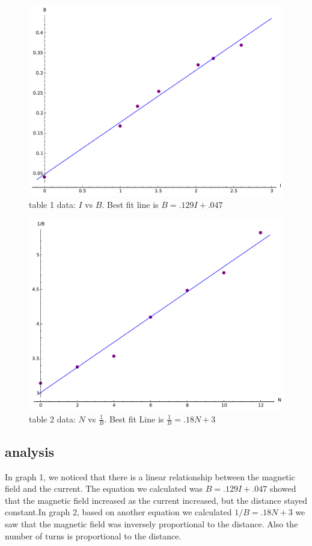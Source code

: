 \documentclass[12pt]{article}
\begin{document}
	\begin{figure}[hp]
	 \centering
	 \includegraphics[scale = .85]{plot1}
	 \caption*{table 1 data: $I$ vs $B$. Best fit line is $B = .129I + .047$}
	\end{figure} 

	\begin{figure}[hp]
	 \centering
	 \includegraphics[scale = .85]{plot2}
	 \caption*{table 2 data: $N$ vs $\frac{1}{B}$. Best fit Line is $ \frac{1}{B} = .18N + 3 $}
	\end{figure}
	\FloatBarrier

\subsection*{analysis}
In graph 1, we noticed that there is a linear relationship between the magnetic field and the current. The equation we calculated was $B=.129I+.047$ showed that the magnetic field increased as the current increased, but the distance stayed constant.In graph 2, based on another equation we calculated $1/B=.18N+3$ we saw that the magnetic field was inversely proportional to the distance. Also the number of turns is proportional to the distance. 
\end{document}

